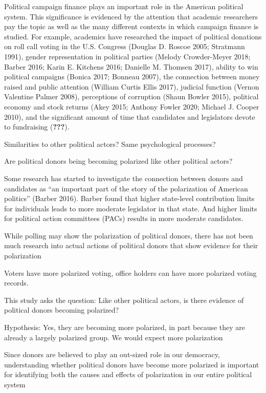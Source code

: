 \documentclass[11pt,]{article}
\begin{document}
\vskip -8.5pt



\noindent \doublespacing 

Political campaign finance plays an important role in the American
political system. This significance is evidenced by the attention that
academic researchers pay the topic as well as the many different
contexts in which campaign finance is studied. For example, academics
have researched the impact of political donations on roll call voting in
the U.S. Congress (Douglas D. Roscoe 2005; Stratmann 1991), gender
representation in political parties (Melody Crowder-Meyer 2018; Barber
2016; Karin E. Kitchens 2016; Danielle M. Thomsen 2017), ability to win
political campaigns (Bonica 2017; Bonneau 2007), the connection between
money raised and public attention (William Curtis Ellis 2017), judicial
function (Vernon Valentine Palmer 2008), perceptions of corruption
(Shaun Bowler 2015), political economy and stock returns (Akey 2015;
Anthony Fowler 2020; Michael J. Cooper 2010), and the significant amount
of time that candidates and legislators devote to fundraising
({\textbf{???}}).

Similarities to other political actors? Same psychological processes?

Are political donors being becoming polarized like other political
actors?

Some research has started to investigate the connection between donors
and candidates as ``an important part of the story of the polarization
of American politics'' (Barber 2016). Barber found that higher
state-level contribution limits for individuals leads to more moderate
legislator in that state. And higher limits for political action
committees (PACs) results in more moderate candidates.

While polling may show the polarization of political donors, there has
not been much research into actual actions of political donors that show
evidence for their polarization

Voters have more polarized voting, office holders can have more
polarized voting records.

This study asks the question: Like other political actors, is there
evidence of political donors becoming polarized?

Hypothesis: Yes, they are becoming more polarized, in part because they
are already a largely polarized group. We would expect more polarization

Since donors are believed to play an out-sized role in our democracy,
understanding whether political donors have become more polarized is
important for identifying both the causes and effects of polarization in
our entire political system
\end{document}
